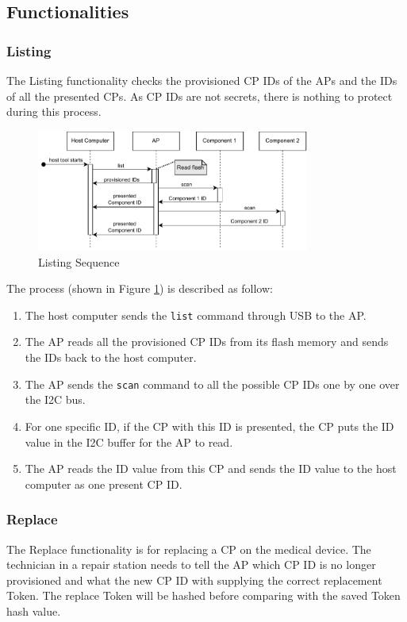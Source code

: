 \documentclass[11pt,oneside,onecolumn,letterpaper]{article}
\begin{document}
	\subsection{Functionalities}
	\subsubsection{Listing}
	The Listing functionality checks the provisioned CP IDs of the APs and the IDs of all the presented CPs.
	As CP IDs are not secrets,
	there is nothing to protect during this process.
	
	\begin{figure}[h]
		\centering
		\includegraphics[width=0.8\textwidth]{pics/list.pdf}
		\caption{Listing Sequence}
		\label{fig:functionality_list}
	\end{figure}
	
	The process (shown in Figure \ref{fig:functionality_list}) is described as follow:
	
	\begin{enumerate}
		\item The host computer sends the \texttt{list} command through USB to the AP.
		\item The AP reads all the provisioned CP IDs from its flash memory and sends the IDs back to the host computer.
		\item The AP sends the \texttt{scan} command to all the possible CP IDs one by one over the I2C bus.
		\item For one specific ID,
		if the CP with this ID is presented,
		the CP puts the ID value in the I2C buffer for the AP to read.
		\item The AP reads the ID value from this CP and sends the ID value to the host computer as one present CP ID.
		
	\end{enumerate}
	
	\subsubsection{Replace}
	The Replace functionality is for replacing a CP on the medical device.
	The technician in a repair station needs to tell the AP which CP ID is no longer provisioned and what the new CP ID with supplying the correct replacement Token.
	The replace Token will be hashed before comparing with the saved Token hash value.
	
\end{document}
